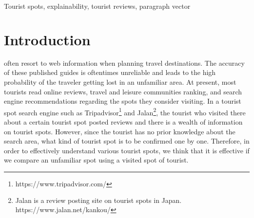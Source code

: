 \documentclass[journal]{IAENGtran}
\begin{document}
\begin{IAENGkeywords}
Tourist spots, explainability, tourist reviews, paragraph vector
\end{IAENGkeywords}

\IAENGpeerreviewmaketitle

\section{Introduction}
\label{sec:Introduction}
 often resort to web information when planning travel destinations.
The accuracy of these published guides is oftentimes unreliable and leads to the high probability of the traveler getting lost in an unfamiliar area.
At present, most tourists read online reviews, travel and leisure communities ranking, and search engine recommendations regarding the spots they consider visiting.
In a tourist spot search engine such as Tripadvisor\footnote{https://www.tripadvisor.com/} and Jalan\footnote{Jalan is a review posting site on tourist spots in Japan. https://www.jalan.net/kankou/}, the tourist who visited there about a certain tourist spot posted reviews and there is a wealth of information on tourist spots.
However, since the tourist has no prior knowledge about the search area, what kind of tourist spot is to be confirmed one by one.
Therefore, in order to effectively understand various tourist spots, we think that it is effective if we compare an unfamiliar spot using a visited spot of tourist.
\end{document}
